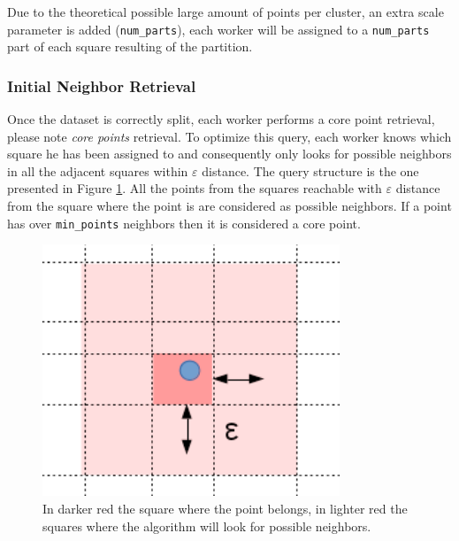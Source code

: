 \documentclass[10pt,journal,compsoc]{IEEEtran}
\let\MYoriglatexcaption\caption
\renewcommand{\caption}[2][\relax]{\MYoriglatexcaption[#2]{#2}}
\begin{document}
Due to the theoretical possible large amount of points per cluster, an extra scale parameter is added (\texttt{num\_parts}), each worker will be assigned to a \texttt{num\_parts} part of each square resulting of the partition.

\subsubsection{Initial Neighbor Retrieval} \label{neigh_retr} 
Once the dataset is correctly split, each worker performs a core point retrieval, please note \emph{core points} retrieval. To optimize this query, each worker knows which square he has been assigned to and consequently only looks for possible neighbors in all the adjacent squares within $\varepsilon$ distance. The query structure is the one presented in Figure \ref{fig:query}. All the points from the squares reachable with $\varepsilon$ distance from the square where the point is are considered as possible neighbors. If a point has over \texttt{min\_points} neighbors then it is considered a core point.

\begin{figure}[!t]
\centering
\includegraphics[width=3.5in]{img/dibuixEps.png}
\caption{In darker red the square where the point belongs, in lighter red the squares where the algorithm will look for possible neighbors.}
\label{fig:query}
\end{figure}
\end{document}
